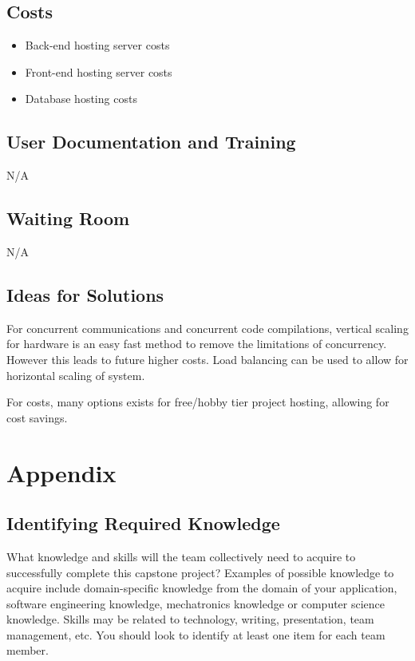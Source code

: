 \documentclass[12pt, titlepage]{article}
\begin{document}
\subsection{Costs}
\begin{itemize}
    \item Back-end hosting server costs
    \item Front-end hosting server costs
    \item Database hosting costs
\end{itemize}

\subsection{User Documentation and Training}
N/A

\subsection{Waiting Room}
N/A

\subsection{Ideas for Solutions}
For concurrent communications and concurrent code compilations, vertical scaling for hardware is an easy fast method to remove the limitations of concurrency. However this leads to future higher costs. Load balancing can be used to allow for horizontal scaling of system.

For costs, many options exists for free/hobby tier project hosting, allowing for cost savings.

\newpage

\section{Appendix}


\subsection{Identifying Required Knowledge}

What knowledge and skills will the team collectively need to acquire to successfully complete this capstone project? Examples of possible knowledge to acquire include domain-specific knowledge from the domain of your application, software engineering knowledge, mechatronics knowledge or computer science knowledge. Skills may be related to technology, writing, presentation, team management, etc. You should look to identify at least one item for each team member.
\end{document}
